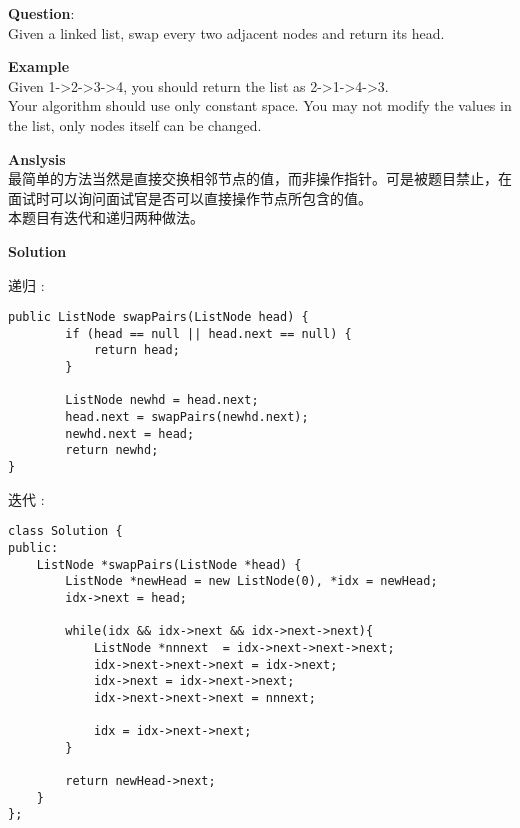     
\begin{description}
    \item{\textbf{Question}}:\\%
		Given a linked list, swap every two adjacent nodes and return its head.

    \item{\textbf{Example}}\\
		Given 1->2->3->4, you should return the list as 2->1->4->3.\\
		Your algorithm should use only constant space. You may not modify the values in the list, only nodes itself can be changed.

    \item{\textbf{Anslysis}}\\
		最简单的方法当然是直接交换相邻节点的值，而非操作指针。可是被题目禁止，在面试时可以询问面试官是否可以直接操作节点所包含的值。\\				
		本题目有迭代和递归两种做法。\\


    \item{\textbf{Solution}}
	\item{递归} : \\
		\begin{lstlisting}
public ListNode swapPairs(ListNode head) {
        if (head == null || head.next == null) {
            return head;
        }

        ListNode newhd = head.next;
        head.next = swapPairs(newhd.next);
        newhd.next = head;
        return newhd;
}
		\end{lstlisting}
	\item{迭代} : \\
		\begin{lstlisting}
class Solution {
public:
    ListNode *swapPairs(ListNode *head) {
    	ListNode *newHead = new ListNode(0), *idx = newHead;
    	idx->next = head;
    
    	while(idx && idx->next && idx->next->next){
    		ListNode *nnnext  = idx->next->next->next;
    		idx->next->next->next = idx->next;
    		idx->next = idx->next->next;
    		idx->next->next->next = nnnext;
    
    		idx = idx->next->next;
    	}
    
    	return newHead->next;
    }
};
		\end{lstlisting}

\end{description}

